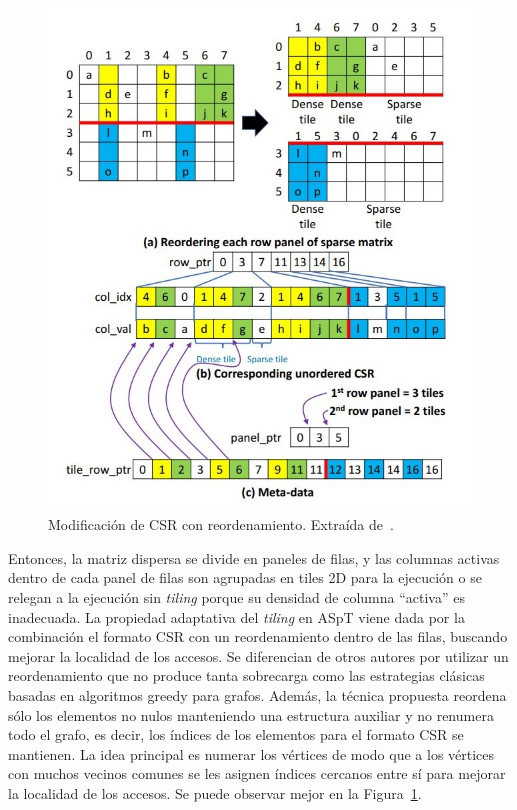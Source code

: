 \begin{figure}[h]
    \centering
    \includegraphics[width=.7\textwidth]{imagenes/chapter3/aspt_csr.jpg}
    \caption{Modificación de CSR con reordenamiento. Extraída de~\cite{Hong2019}.}
    \label{fig:aspt_csr}
\end{figure}
Entonces, la matriz dispersa se divide en paneles de filas, y las columnas activas dentro de cada panel de filas son agrupadas en tiles 2D para la ejecución o se relegan a la ejecución sin \textit{tiling} porque su densidad de columna ``activa'' es inadecuada. La propiedad adaptativa del \textit{tiling} en ASpT viene dada por la combinación el formato CSR con un reordenamiento dentro de las filas, buscando mejorar la localidad de los accesos. Se diferencian de otros autores por utilizar un reordenamiento que no produce tanta sobrecarga como las estrategias clásicas basadas en algoritmos greedy para grafos. Además, la técnica propuesta reordena sólo los elementos no nulos manteniendo una estructura auxiliar y no renumera todo el grafo, es decir, los índices de los elementos para el formato CSR se mantienen. La idea principal es numerar los vértices de modo que a los vértices con muchos vecinos comunes se les asignen índices cercanos entre sí para mejorar la localidad de los accesos. Se puede observar mejor en la Figura~\ref{fig:aspt_csr}.

